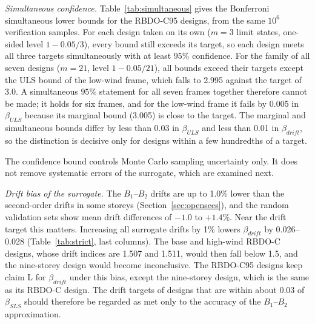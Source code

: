 \emph{Simultaneous confidence.} Table~\ref{tab:simultaneous} gives the Bonferroni simultaneous lower
bounds for the RBDO-C95 designs, from the same $10^6$ verification samples. For each design taken on
its own ($m=3$ limit states, one-sided level $1-0.05/3$), every bound still exceeds its target, so
each design meets all three targets simultaneously with at least $95\%$ confidence. For the family of
all seven designs ($m=21$, level $1-0.05/21$), all bounds exceed their targets except the ULS bound of
the low-wind frame, which falls to 2.995 against the target of 3.0. A simultaneous $95\%$ statement
for all seven frames together therefore cannot be made; it holds for six frames, and for the
low-wind frame it fails by 0.005 in $\beta_{ULS}$ because its marginal bound (3.005) is close to the
target. The marginal and simultaneous bounds differ by less than 0.03 in $\beta_{ULS}$ and less than 0.01
in $\beta_{drift}$, so the distinction is decisive only for designs within a few hundredths of a
target.

\begin{table}[!htbp]
\centering
\caption{RBDO-C95 designs: one-sided lower confidence bounds of the reliability indices ($10^6$
independent samples, baseline surrogate model). Marginal: $95\%$ bound for each limit state
separately. $m=3$: Bonferroni bounds that hold simultaneously for the three limit states of the design
with at least $95\%$ confidence. $m=21$: Bonferroni bounds that hold simultaneously for all three limit
states of all seven designs. Bold: below the target. The deflection bounds come from zero observed
failures. The bounds address Monte Carlo sampling uncertainty only.}
\label{tab:simultaneous}
\small
\fittable{}
\end{table} The confidence bound controls Monte Carlo sampling uncertainty only. It does not
remove systematic errors of the surrogate, which are examined next.

\emph{Drift bias of the surrogate.} The $B_1$--$B_2$ drifts are up to 1.0\% lower than the
second-order drifts in some storeys (Section~\ref{sec:opensees}), and the random validation sets
show mean drift differences of $-1.0$ to $+1.4\%$. Near the drift target this matters. Increasing
all surrogate drifts by 1\% lowers $\beta_{drift}$ by 0.026--0.028
(Table~\ref{tab:strict}, last columns). The base and high-wind RBDO-C designs, whose drift indices are
1.507 and 1.511, would then fall below 1.5, and the nine-storey design would become inconclusive.
The RBDO-C95 designs keep claim L for $\beta_{drift}$ under this bias, except the nine-storey
design, which is the same as its RBDO-C design. The drift targets of designs that are within about 0.03
of $\beta_{SLS}$ should therefore be regarded as met only to the accuracy of the $B_1$--$B_2$
approximation.

